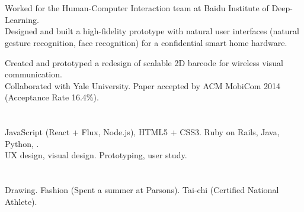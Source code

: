 \begin{resume}
\section{}

\begin{position}
Worked for the Human-Computer Interaction team at Baidu Institute of Deep-Learning. \\
Designed and built a high-fidelity prototype with natural user interfaces (natural gesture recognition, face recognition) for a confidential smart home hardware.
\end{position}

\begin{position}
Created and prototyped a redesign of scalable 2D barcode for wireless visual communication. \\
Collaborated with Yale University. Paper accepted by ACM MobiCom 2014 (Acceptance Rate 16.4\%).
\end{position}

\section{}
JavaScript (React + Flux, Node.js), HTML5 + CSS3. Ruby on Rails, Java, Python, \Cplusplus. \\
UX design, visual design. Prototyping, user study.

\section{}
Drawing. Fashion (Spent a summer at Parsons). Tai-chi (Certified National Athlete).

\end{resume}


